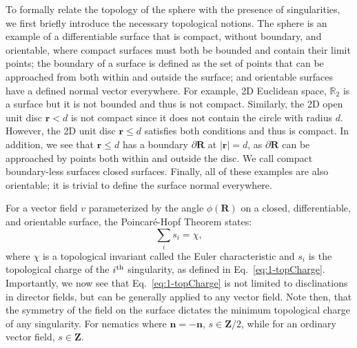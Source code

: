 To formally relate the topology of the sphere with the presence of singularities, we first briefly introduce the necessary topological notions.
The sphere is an example of a differentiable surface that is compact, without boundary, and orientable, where compact surfaces must both be bounded and contain their limit points; the boundary of a surface is defined as the set of points that can be approached from both within and outside the surface; and orientable surfaces have a defined normal vector everywhere.
For example, 2D Euclidean space, $\mathbb{R}_2$ is a surface but it is not bounded and thus is not compact.
Similarly, the 2D open unit disc $\mathbf{r} < d$ is not compact since it does not contain the circle with radius $d$.
However, the 2D unit disc $\mathbf{r} \leq d$ satisfies both conditions and thus is compact.
In addition, we see that $\mathbf{r} \leq d$ has a boundary $\partial \mathbf{R}$ at $|\mathbf{r}| = d$, as $\partial \mathbf{R}$ can be approached by points both within and outside the disc.
We call compact boundary-less surfaces closed surfaces.
Finally, all of these examples are also orientable; it is trivial to define the surface normal everywhere.

For a vector field $v$ parameterized by the angle $\phi(\mathbf{R})$ on a closed, differentiable, and orientable surface, the Poincar\'e-Hopf Theorem states:
\begin{equation}
  \sum\limits_i s_i = \chi,\label{e:1-PH}
\end{equation}
where $\chi$ is a topological invariant called the Euler characteristic and $s_i$ is the topological charge of the $i^{\rm th}$ singularity, as defined in Eq.~\ref{eq:1-topCharge}.
Importantly, we now see that Eq.~\ref{eq:1-topCharge} is not limited to disclinations in director fields, but can be generally applied to any vector field.
Note then, that the symmetry of the field on the surface dictates the minimum topological charge of any singularity.
For nematics where $\mathbf{n} = -\mathbf{n}$, $s \in \mathbf{Z}/2$, while for an ordinary vector field, $s \in \mathbf{Z}$.




